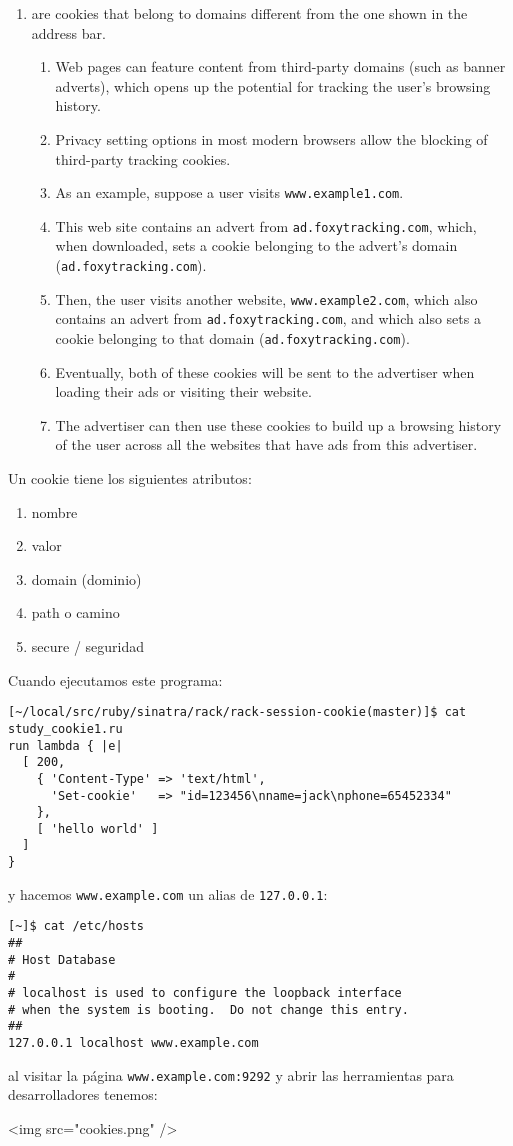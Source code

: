 \begin{enumerate}
\item 
{} are
cookies that belong to domains different from the one shown in the
address bar. 
  \begin{enumerate}
  \item 
  Web pages can feature content from third-party domains
  (such as banner adverts), which opens up the potential for tracking
  the user's browsing history. 
  \item 
  Privacy setting options in most modern
  browsers allow the blocking of third-party tracking cookies.
  \item 
  As an example, suppose a user visits \verb|www.example1.com|. 
  \item 
  This web
  site contains an advert from \verb|ad.foxytracking.com|, which, when
  downloaded, sets a cookie belonging to the advert's domain
  (\verb|ad.foxytracking.com|). 
  \item 
  Then, the user visits another website,
  \verb|www.example2.com|, which also contains an advert from 
  \verb|ad.foxytracking.com|,
  and which also sets a cookie belonging to that domain
  (\verb|ad.foxytracking.com|). 
  \item 
  Eventually, both of these cookies will be
  sent to the advertiser when loading their ads or visiting their
  website. 
  \item 
  The advertiser can then use these cookies to build up a
  browsing history of the user across all the websites that have ads
  from this advertiser.
  \end{enumerate}
\end{enumerate}


Un cookie tiene los siguientes atributos:
\begin{enumerate}
\item 
nombre
\item 
valor
\item 
domain (dominio)
\item 
path o camino
\item 
secure / seguridad
\end{enumerate}

Cuando ejecutamos este programa:
\begin{verbatim}
[~/local/src/ruby/sinatra/rack/rack-session-cookie(master)]$ cat study_cookie1.ru 
run lambda { |e|
  [ 200, 
    { 'Content-Type' => 'text/html',
      'Set-cookie'   => "id=123456\nname=jack\nphone=65452334"
    }, 
    [ 'hello world' ]
  ]
}
\end{verbatim}
y hacemos \verb|www.example.com| un alias de \verb|127.0.0.1|:
\begin{verbatim}
[~]$ cat /etc/hosts
##
# Host Database
#
# localhost is used to configure the loopback interface
# when the system is booting.  Do not change this entry.
##
127.0.0.1 localhost www.example.com
\end{verbatim}
al visitar la página \verb|www.example.com:9292| 
y abrir las herramientas para desarrolladores 
tenemos:
\begin{rawhtml}
<img src="cookies.png" />
\end{rawhtml}

